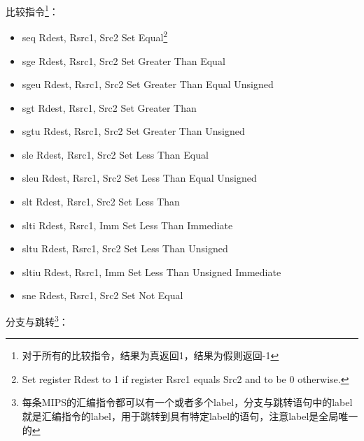 \documentclass[a4paper, 11pt]{article}
\begin{document}
	比较指令\footnote{对于所有的比较指令，结果为真返回1，结果为假则返回-1}：
	\begin{itemize}
		\item seq Rdest, Rsrc1, Src2	\hfill Set Equal\footnote{Set register Rdest to 1 if register Rsrc1 equals Src2 and to be 0 otherwise.}
		\item sge Rdest, Rsrc1, Src2	\hfill Set Greater Than Equal
		\item sgeu Rdest, Rsrc1, Src2	\hfill Set Greater Than Equal Unsigned
		\item sgt Rdest, Rsrc1, Src2	\hfill Set Greater Than
		\item sgtu Rdest, Rsrc1, Src2	\hfill Set Greater Than Unsigned
		\item sle Rdest, Rsrc1, Src2	\hfill Set Less Than Equal
		\item sleu Rdest, Rsrc1, Src2	\hfill Set Less Than Equal Unsigned
		\item slt Rdest, Rsrc1, Src2	\hfill Set Less Than
		\item slti Rdest, Rsrc1, Imm	\hfill Set Less Than Immediate
		\item sltu Rdest, Rsrc1, Src2	\hfill Set Less Than Unsigned
		\item sltiu Rdest, Rsrc1, Imm	\hfill Set Less Than Unsigned Immediate
		\item sne Rdest, Rsrc1, Src2	\hfill Set Not Equal
	\end{itemize}
	分支与跳转\footnote{每条MIPS的汇编指令都可以有一个或者多个label，分支与跳转语句中的label就是汇编指令的label，用于跳转到具有特定label的语句，注意label是全局唯一的}：
\end{document}
